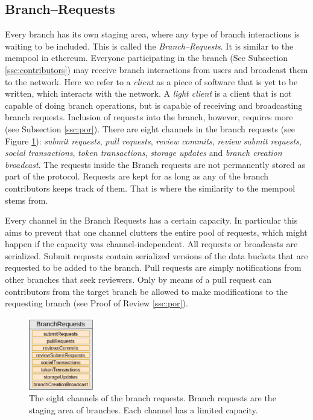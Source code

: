 \subsection{Branch--Requests}
\label{ssc:branchrequests}

Every branch has its own staging area, where any type of branch interactions is waiting to be included. This is called the \textit{Branch--Requests}. It is similar to the mempool in ethereum. Everyone participating in the branch (See Subsection \ref{ssc:contributors}) may receive branch interactions from users and broadcast them to the network. Here we refer to a \textit{client} as a piece of software that is yet to be written, which interacts with the network. A \textit{light client} is a client that is not capable of doing branch operations, but is capable of receiving and broadcasting branch requests. Inclusion of requests into the branch, however, requires more (see Subsection \ref{ssc:por}). There are eight channels in the branch requests (see Figure \ref{fig:mempool}): \textit{submit requests}, \textit{pull requests}, \textit{review commits}, \textit{review submit requests}, \textit{social transactions}, \textit{token transactions}, \textit{storage updates} and \textit{branch creation broadcast}. The requests inside the Branch requests are not permanently stored as part of the protocol. Requests are kept for as long as any of the branch contributors keeps track of them. That is where the similarity to the mempool stems from.

Every channel in the Branch Requests has a certain capacity. In particular this aims to prevent that one channel clutters the entire pool of requests, which might happen if the capacity was channel-independent. All requests or broadcasts are serialized. 
Submit requests contain serialized versions of the data buckets that are requested to be added to the branch. Pull requests are simply notifications from other branches that seek reviewers. Only by means of a pull request can contributors from the target branch be allowed to make modifications to the requesting branch (see Proof of Review \ref{ssc:por}).





\begin{figure}[h!]
  \begin{center}
    \includegraphics[width=0.25\textwidth]{src/img/MempoolV3.png}
\end{center}
 \caption{The eight channels of the branch requests. Branch requests are the staging area of branches. Each channel has a limited capacity.}
 \label{fig:mempool}
\end{figure}
